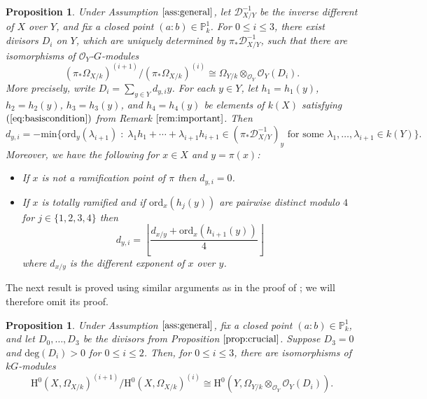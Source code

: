 \documentclass{amsart}
\numberwithin{equation}{section}
\numberwithin{table}{section}
\theoremstyle{plain}
\newtheorem{proposition}[theorem]{Proposition}
\theoremstyle{definition}
\theoremstyle{remark}
\newcommand{\HH}{\mathrm{H}}
\begin{document}
\begin{proposition}
\label{prop:crucial}
Under Assumption $\ref{ass:general}$, let $\mathcal{D}_{X/Y}^{-1}$ be the inverse different of $X$ over $Y$, and fix a closed point $(a:b)\in \mathbb{P}^1_k$. For $0\le i\le 3$, there exist divisors $D_i$ on $Y$, which are uniquely determined by $\pi_*\mathcal{D}_{X/Y}^{-1}$, such that there are isomorphisms of $\mathcal{O}_Y$-$G$-modules
$$(\pi_*\Omega_{X/k})^{(i+1)}/(\pi_*\Omega_{X/k})^{(i)} \cong \Omega_{Y/k}\otimes_{\mathcal{O}_Y}\mathcal{O}_Y(D_i).$$
More precisely, write $D_i=\sum_{y\in Y} d_{y,i} y$. For each $y\in Y$, let $h_1=h_1(y)$, $h_2 = h_2(y)$, $h_3 = h_3(y)$, and $h_4 = h_4(y)$ be elements of $k(X)$ satisfying $(\ref{eq:basiscondition})$ from Remark $\ref{rem:important}$. Then
$$d_{y,i} = - \mathrm{min}\{\mathrm{ord}_y(\lambda_{i+1}) \; : \; \lambda_1h_1 +\cdots+ \lambda_{i+1} h_{i+1} \in (\pi_*\mathcal{D}_{X/Y}^{-1})_y \mbox{ for some } \lambda_1,\ldots,\lambda_{i+1} \in k(Y)\}. $$
Moreover, we have the following for $x\in X$ and $y=\pi(x)$:
\begin{itemize}
\item[(i)] If $x$ is not a ramification point of $\pi$ then $d_{y,i}=0$.
\item[(ii)] If $x$ is totally ramified and if $\mathrm{ord}_x(h_j(y))$ are pairwise distinct modulo $4$ for $j\in\{1,2,3,4\}$ then 
\begin{equation}
\label{eq:divisor}
d_{y,i}=\left\lfloor \frac{d_{x/y} +\mathrm{ord}_x(h_{i+1}(y))}{4}\right\rfloor
\end{equation}
where $d_{x/y}$ is the different exponent of $x$ over $y$.
\end{itemize}
\end{proposition}


The next result is proved using similar arguments as in the proof of \cite[Lemma 4.2]{BleherChinburgKontogeorgis2020}; we will therefore omit its proof.

\begin{proposition}
\label{prop:dimension}
Under Assumption $\ref{ass:general}$, fix a closed point $(a:b)\in \mathbb{P}^1_k$, and let $D_0,\ldots,D_3$ be the divisors from Proposition $\ref{prop:crucial}$. Suppose $D_3=0$ and $\mathrm{deg}(D_i)>0$ for $0\le i \le 2$.
Then, for $0\le i\le 3$, there are isomorphisms of $kG$-modules
$$\HH^0(X,\Omega_{X/k})^{(i+1)}/\HH^0(X,\Omega_{X/k})^{(i)} \cong\HH^0(Y,\Omega_{Y/k}\otimes_{\mathcal{O}_Y}\mathcal{O}_Y(D_i)).$$
\end{proposition}
\end{document}
